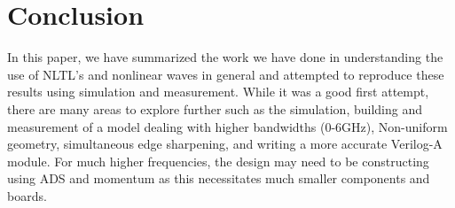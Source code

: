 \documentclass[journal]{IEEEtran} \usepackage[english]{babel}
\begin{document}
\section{ Conclusion} 

In this paper, we have summarized the work we have done in understanding the use
of NLTL's and nonlinear waves in general and attempted to reproduce these
results using simulation and measurement. While it was a good first attempt,
there are many areas to explore further such as the simulation, building and
measurement of a model dealing with higher bandwidths (0-6GHz), Non-uniform
geometry, simultaneous edge sharpening, and writing a more accurate Verilog-A
module. For much higher frequencies, the design may need to be constructing using
ADS and momentum as this necessitates much smaller components and boards. 












 
 
 
 
 
 
 
 
 
 
 
 
 










\end{document}
